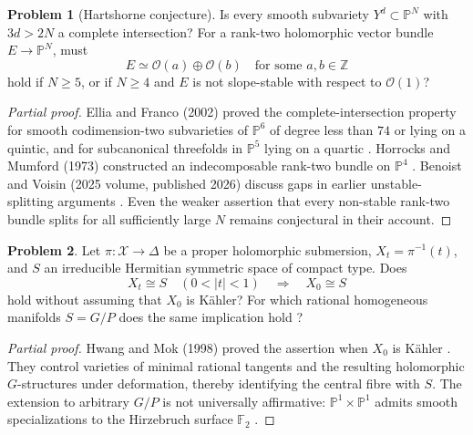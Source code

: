 \documentclass[11pt,reqno]{amsart}
\theoremstyle{definition}
\newtheorem{problem}{Problem}[section]
\theoremstyle{remark}
\begin{document}
\begin{problem}[Hartshorne conjecture]\label{Siu-1.1}
Is every smooth subvariety $Y^d\subset\mathbb P^N$ with $3d>2N$ a complete intersection? For a rank-two holomorphic vector bundle $E\to\mathbb P^N$, must
\[
E\simeq\mathcal O(a)\oplus\mathcal O(b)\quad\text{for some }a,b\in\mathbb Z
\]
hold if $N\geq5$, or if $N\geq4$ and $E$ is not slope-stable with respect to $\mathcal O(1)$?
\end{problem}
\begin{proof}[Partial proof]
Ellia and Franco (2002) proved the complete-intersection property for smooth codimension-two subvarieties of $\mathbb P^6$ of degree less than $74$ or lying on a quintic, and for subcanonical threefolds in $\mathbb P^5$ lying on a quartic \cite{SIU-EF99}. Horrocks and Mumford (1973) constructed an indecomposable rank-two bundle on $\mathbb P^4$ \cite{SIU-HM73}. Benoist and Voisin (2025 volume, published 2026) discuss gaps in earlier unstable-splitting arguments \cite[\S2.3]{SIU-BV25}. Even the weaker assertion that every non-stable rank-two bundle splits for all sufficiently large $N$ remains conjectural in their account.
\end{proof}

\begin{problem}\label{Siu-1.6}
Let $\pi:\mathcal X\to\Delta$ be a proper holomorphic submersion, $X_t=\pi^{-1}(t)$, and $S$ an irreducible Hermitian symmetric space of compact type. Does
\[
X_t\cong S\quad(0<|t|<1)\quad\Longrightarrow\quad X_0\cong S
\]
hold without assuming that $X_0$ is K\"ahler?
For which rational homogeneous manifolds $S=G/P$ does the same implication hold \cite[\S1.6]{Siu2025}?
\end{problem}
\begin{proof}[Partial proof]
Hwang and Mok (1998) proved the assertion when $X_0$ is K\"ahler \cite{SIU-HM98}. They control varieties of minimal rational tangents and the resulting holomorphic $G$-structures under deformation, thereby identifying the central fibre with $S$.
The extension to arbitrary $G/P$ is not universally affirmative: $\mathbb P^1\times\mathbb P^1$ admits smooth specializations to the Hirzebruch surface $\mathbb F_2$ \cite[Introduction]{SIU-HM98}.
\end{proof}
\end{document}
